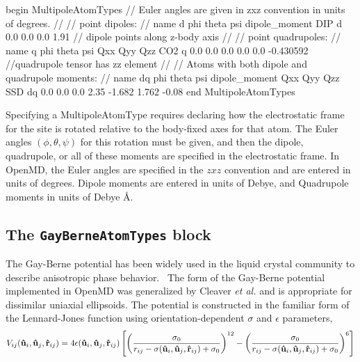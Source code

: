 \documentclass[letterpaper]{report}
\begin{document}
\begin{code}[caption={[An example of a MultipoleAtomTypes block.] A
simple example of a MultipoleAtomTypes block.   Dipoles are given in
units of Debyes, and Quadrupole moments are given in units of Debye
\AA~(or $10^{-26} \mathrm{~esu~cm}^2$)},
label={sch:MultipoleAtomTypesBlock}]
begin MultipoleAtomTypes
// Euler angles are given in zxz convention in units of degrees.
//
// point dipoles:
// name d phi theta psi dipole_moment
DIP     d 0.0 0.0   0.0     1.91   // dipole points along z-body axis
//
// point quadrupoles:
// name q phi theta psi Qxx Qyy Qzz
CO2     q 0.0 0.0   0.0 0.0 0.0 -0.430592  //quadrupole tensor has zz element
//
// Atoms with both dipole and quadrupole moments:
// name dq phi theta psi dipole_moment  Qxx    Qyy     Qzz
SSD     dq 0.0 0.0   0.0     2.35      -1.682  1.762   -0.08
end MultipoleAtomTypes
\end{code}

Specifying a MultipoleAtomType requires declaring how the
electrostatic frame for the site is rotated relative to the body-fixed
axes for that atom. The Euler angles $(\phi, \theta, \psi)$ for this
rotation must be given, and then the dipole, quadrupole, or all of
these moments are specified in the electrostatic frame.  In OpenMD,
the Euler angles are specified in the $zxz$ convention and are entered
in units of degrees.  Dipole moments are entered in units of Debye,
and Quadrupole moments in units of Debye \AA.


\subsection{\label{section:ffGB}The {\tt GayBerneAtomTypes} block}

The Gay-Berne potential has been widely used in the liquid crystal
community to describe anisotropic phase
behavior.~\cite{Gay:1981yu,Berne:1972pb,Kushick:1976xy,Luckhurst:1990fy,Cleaver:1996rt}
The form of the Gay-Berne potential implemented in OpenMD was
generalized by Cleaver {\it et al.} and is appropriate for dissimilar
uniaxial ellipsoids.\cite{Cleaver:1996rt} The potential is constructed
in the familiar form of the Lennard-Jones function using
orientation-dependent $\sigma$ and $\epsilon$ parameters,
\begin{equation*}
V_{ij}({{\bf \hat u}_i}, {{\bf \hat u}_j}, {{\bf \hat
r}_{ij}}) = 4\epsilon ({{\bf \hat u}_i}, {{\bf \hat u}_j},
{{\bf \hat r}_{ij}})\left[\left(\frac{\sigma_0}{r_{ij}-\sigma({{\bf \hat u
}_i},
{{\bf \hat u}_j}, {{\bf \hat r}_{ij}})+\sigma_0}\right)^{12}
-\left(\frac{\sigma_0}{r_{ij}-\sigma({{\bf \hat u}_i}, {{\bf \hat u}_j},
{{\bf \hat r}_{ij}})+\sigma_0}\right)^6\right]
\label{eq:gb}
\end{equation*}
\end{document}
